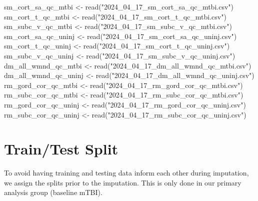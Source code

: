 \documentclass[
  letterpaper,
  DIV=11,
  numbers=noendperiod]{scrreprt}
\newenvironment{Shaded}{\begin{snugshade}}{\end{snugshade}}
\newcommand{\FunctionTok}[1]{\textcolor[rgb]{0.28,0.35,0.67}{#1}}
\newcommand{\NormalTok}[1]{\textcolor[rgb]{0.00,0.23,0.31}{#1}}
\newcommand{\OtherTok}[1]{\textcolor[rgb]{0.00,0.23,0.31}{#1}}
\newcommand{\StringTok}[1]{\textcolor[rgb]{0.13,0.47,0.30}{#1}}
\begin{document}
\begin{Shaded}
\begin{Highlighting}[]
\NormalTok{sm\_cort\_sa\_qc\_mtbi }\OtherTok{\textless{}{-}} \FunctionTok{read}\NormalTok{(}\StringTok{"2024\_04\_17\_sm\_cort\_sa\_qc\_mtbi.csv"}\NormalTok{)}
\NormalTok{sm\_cort\_t\_qc\_mtbi }\OtherTok{\textless{}{-}} \FunctionTok{read}\NormalTok{(}\StringTok{"2024\_04\_17\_sm\_cort\_t\_qc\_mtbi.csv"}\NormalTok{)}
\NormalTok{sm\_subc\_v\_qc\_mtbi }\OtherTok{\textless{}{-}} \FunctionTok{read}\NormalTok{(}\StringTok{"2024\_04\_17\_sm\_subc\_v\_qc\_mtbi.csv"}\NormalTok{)}
\NormalTok{sm\_cort\_sa\_qc\_uninj }\OtherTok{\textless{}{-}} \FunctionTok{read}\NormalTok{(}\StringTok{"2024\_04\_17\_sm\_cort\_sa\_qc\_uninj.csv"}\NormalTok{)}
\NormalTok{sm\_cort\_t\_qc\_uninj }\OtherTok{\textless{}{-}} \FunctionTok{read}\NormalTok{(}\StringTok{"2024\_04\_17\_sm\_cort\_t\_qc\_uninj.csv"}\NormalTok{)}
\NormalTok{sm\_subc\_v\_qc\_uninj }\OtherTok{\textless{}{-}} \FunctionTok{read}\NormalTok{(}\StringTok{"2024\_04\_17\_sm\_subc\_v\_qc\_uninj.csv"}\NormalTok{)}
\NormalTok{dm\_all\_wmnd\_qc\_mtbi }\OtherTok{\textless{}{-}} \FunctionTok{read}\NormalTok{(}\StringTok{"2024\_04\_17\_dm\_all\_wmnd\_qc\_mtbi.csv"}\NormalTok{)}
\NormalTok{dm\_all\_wmnd\_qc\_uninj }\OtherTok{\textless{}{-}} \FunctionTok{read}\NormalTok{(}\StringTok{"2024\_04\_17\_dm\_all\_wmnd\_qc\_uninj.csv"}\NormalTok{)}
\NormalTok{rm\_gord\_cor\_qc\_mtbi }\OtherTok{\textless{}{-}} \FunctionTok{read}\NormalTok{(}\StringTok{"2024\_04\_17\_rm\_gord\_cor\_qc\_mtbi.csv"}\NormalTok{)}
\NormalTok{rm\_subc\_cor\_qc\_mtbi }\OtherTok{\textless{}{-}} \FunctionTok{read}\NormalTok{(}\StringTok{"2024\_04\_17\_rm\_subc\_cor\_qc\_mtbi.csv"}\NormalTok{)}
\NormalTok{rm\_gord\_cor\_qc\_uninj }\OtherTok{\textless{}{-}} \FunctionTok{read}\NormalTok{(}\StringTok{"2024\_04\_17\_rm\_gord\_cor\_qc\_uninj.csv"}\NormalTok{)}
\NormalTok{rm\_subc\_cor\_qc\_uninj }\OtherTok{\textless{}{-}} \FunctionTok{read}\NormalTok{(}\StringTok{"2024\_04\_17\_rm\_subc\_cor\_qc\_uninj.csv"}\NormalTok{)}
\end{Highlighting}
\end{Shaded}

\section{Train/Test Split}\label{traintest-split}

To avoid having training and testing data inform each other during
imputation, we assign the splits prior to the imputation. This is only
done in our primary analysis group (baseline mTBI).
\end{document}

